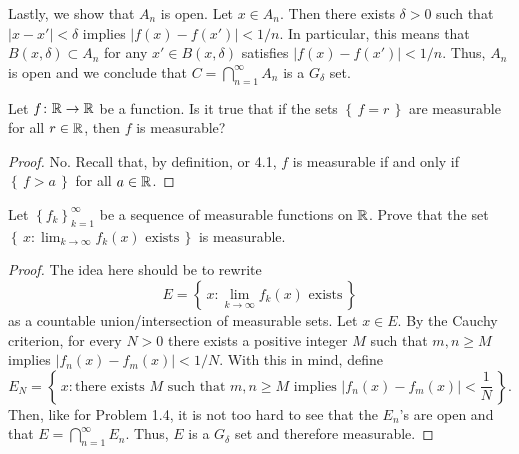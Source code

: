 Lastly, we show that $A_n$ is open. Let $x\in A_n$. Then there exists
$\delta>0$ such that $|x-x'|<\delta$ implies $|f(x)-f(x')|<1/n$. In
particular, this means that $B(x,\delta)\subset A_n$ for any $x'\in
B(x,\delta)$ satisfies $|f(x)-f(x')|<1/n$. Thus, $A_n$ is open and we
conclude that $C=\bigcap_{n=1}^\infty A_n$ is a $G_\delta$ set.
\begin{problem}
Let $f\colon\mathbb{R}\to\mathbb{R}$ be a function. Is it true that if the sets
$\left\{\,f=r\,\right\}$ are measurable for all $r\in\mathbb{R}$, then $f$ is
measurable?
\end{problem}
\begin{proof}
No. Recall that, by definition, or 4.1, $f$ is measurable if and only if
$\left\{\,f>a\,\right\}$ for all $a\in\mathbb{R}$.
\end{proof}

\begin{problem}
Let $\left\{f_k\right\}_{k=1}^\infty$ be a sequence of measurable functions
on $\mathbb{R}$. Prove that the set
$\left\{\,x:\text{$\lim_{k\to\infty} f_k(x)$ exists}\,\right\}$
is measurable.
\end{problem}
\begin{proof}
The idea here should be to rewrite
\begin{equation}
  \label{eq:measurable-lim-set}
E=\left\{\,x:\text{$\lim_{k\to\infty} f_k(x)$ exists}\,\right\}
\end{equation}
as a countable union/intersection of measurable sets. Let $x\in E$. By the
Cauchy criterion, for every $N>0$ there exists a positive integer
$M$ such that $m,n\geq M$ implies
$\left|f_n(x)-f_m(x)\right|<1/N$. With this in mind, define
\begin{equation}
  \label{eq:countable-lim-set}
E_N=
\left\{\,
x:\text{there exists $M$ such that $m,n\geq M$ implies $\left|f_n(x)-f_m(x)\right|<\frac{1}{N}$}
\,\right\}.
\end{equation}
Then, like for Problem 1.4, it is not too hard to see that the $E_n$'s are
open and that $E=\bigcap_{n=1}^\infty E_n$. Thus, $E$ is a $G_\delta$ set
and therefore measurable.
\end{proof}

